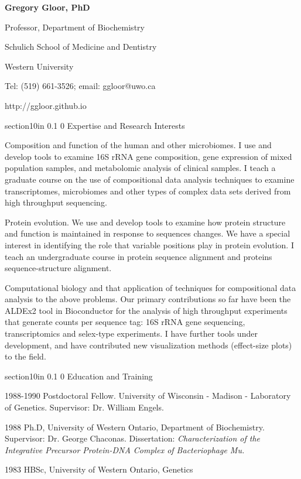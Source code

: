 \documentclass[11pt]{article}
\makeatletter
\renewcommand\section{\@startsection
	{section}{1}{0in}%
	{0.1\baselineskip}%
	{0\baselineskip}%
	{\sffamily\bfseries\large}
}
\makeatother
\begin{document}
\begin{center}
\textbf{Gregory Gloor, PhD}

Professor, Department of Biochemistry

Schulich School of Medicine and Dentistry

Western University

Tel: (519) 661-3526; email: ggloor@uwo.ca 
 
http://ggloor.github.io
\end{center}
\setcounter{tocdepth}{2}
\tableofcontents
\vspace{1cm}

\clearpage 

\section{Expertise and Research Interests}
\begin{description}\itemsep=2pt
\item Composition and function of the human and other microbiomes. I use and develop tools to examine 16S rRNA gene composition, gene expression of mixed population samples, and metabolomic analysis of clinical samples. I teach a graduate course on the use of compositional data analysis techniques to examine transcriptomes, microbiomes and other types of complex data sets derived from high throughput sequencing. 
\item Protein evolution. We use and develop tools to examine how protein structure and function is maintained in response to sequences changes. We have a special interest in identifying the role that variable positions play in protein evolution. I teach an undergraduate course in protein sequence alignment and proteins sequence-structure alignment. 
\item Computational biology and that application of techniques for compositional data analysis to the above problems. Our primary contributions so far have been the ALDEx2 tool in Bioconductor for the analysis of high throughput experiments that generate counts per sequence tag: 16S rRNA gene sequencing, transcriptomics and selex-type experiments. I have further tools under development, and have contributed new visualization methods (effect-size plots) to the field.
\end{description}

\section{Education and Training}
\begin{description}\itemsep=2pt
\item 1988-1990  Postdoctoral Fellow.  University of Wisconsin - Madison - Laboratory of Genetics. Supervisor: Dr. William Engels.
\item 1988  Ph.D, University of Western Ontario, Department of Biochemistry. Supervisor: Dr. George Chaconas. Dissertation: \textit{Characterization of the Integrative Precursor  Protein-DNA Complex of Bacteriophage Mu.}
\item 1983  HBSc, University of Western Ontario, Genetics
\end{description}
\end{document}
